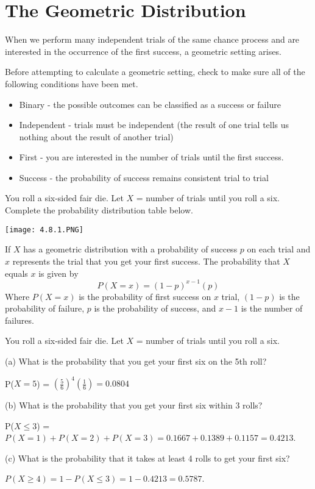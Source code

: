 \documentclass[../stats.tex]{subfiles}
\begin{document}
\section{The Geometric Distribution}
When we perform many independent trials of the same chance process and are interested in the occurrence of the first success, a geometric setting arises.

Before attempting to calculate a geometric setting, check to make sure all of the following conditions have been met.

\begin{itemize}
    \item Binary - the possible outcomes can be classified as a success or failure 
    \item Independent - trials must be independent (the result of one trial tells us nothing about the result of another trial)
    \item First - you are interested in the number of trials until the first success.
    \item Success - the probability of success remains consistent trial to trial 
\end{itemize}

\begin{example}
    You roll a six-sided fair die. Let $X$ = number of trials until you roll a six. Complete the probability distribution table below.

    \begin{center}
        \texttt{[image: 4.8.1.PNG]}
    \end{center}
\end{example}

If $X$ has a geometric distribution with a probability of success $p$ on each trial and $x$ represents the trial that you get your first success. The probability that $X$ equals $x$ is given by 
\[ P(X=x)=(1-p)^{x-1}(p) \]
Where $P(X=x)$ is the probability of first success on $x$ trial, $(1-p)$ is the probability of failure, $p$ is the probability of success, and $x-1$ is the number of failures.

\begin{example}
    You roll a six-sided fair die. Let $X$ = number of trials until you roll a six.

    (a) What is the probability that you get your first six on the 5th roll?

    P($X=5$) = $\left(\frac{5}{6}\right)^4\left(\frac{1}{6}\right) = 0.0804$

    (b) What is the probability that you get your first six within 3 rolls?

    P($X\leq 3$) = $P(X=1)+P(X=2)+P(X=3) = 0.1667+0.1389+0.1157 = 0.4213$.

    (c) What is the probability that it takes at least 4 rolls to get your first six?

    $P(X\geq 4)=1-P(X\leq 3) = 1-0.4213 = 0.5787$.
\end{example}
\end{document}
